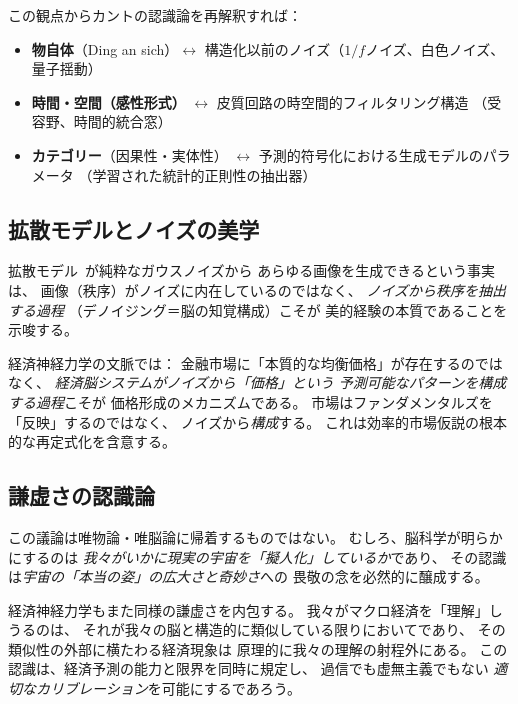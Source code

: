 \documentclass[12pt,twocolumn]{ltjsarticle}
\begin{document}
この観点からカントの認識論を再解釈すれば：

\begin{itemize}
\item \textbf{物自体}（Ding an sich）$\leftrightarrow$
構造化以前のノイズ（$1/f$ノイズ、白色ノイズ、
量子揺動）

\item \textbf{時間・空間（感性形式）} $\leftrightarrow$
皮質回路の時空間的フィルタリング構造
（受容野、時間的統合窓）

\item \textbf{カテゴリー}（因果性・実体性） $\leftrightarrow$
予測的符号化における生成モデルのパラメータ
（学習された統計的正則性の抽出器）
\end{itemize}

\subsection{拡散モデルとノイズの美学}

拡散モデル~\cite{Ho2020}が純粋なガウスノイズから
あらゆる画像を生成できるという事実は、
画像（秩序）がノイズに内在しているのではなく、
\emph{ノイズから秩序を抽出する過程}
（デノイジング＝脳の知覚構成）こそが
美的経験の本質であることを示唆する。

経済神経力学の文脈では：
金融市場に「本質的な均衡価格」が存在するのではなく、
\emph{経済脳システムがノイズから「価格」という
予測可能なパターンを構成する過程}こそが
価格形成のメカニズムである。
市場はファンダメンタルズを「反映」するのではなく、
ノイズから\emph{構成}する。
これは効率的市場仮説の根本的な再定式化を含意する。

\subsection{謙虚さの認識論}

この議論は唯物論・唯脳論に帰着するものではない。
むしろ、脳科学が明らかにするのは
\emph{我々がいかに現実の宇宙を「擬人化」しているか}であり、
その認識は\emph{宇宙の「本当の姿」の広大さと奇妙さ}への
畏敬の念を必然的に醸成する。

経済神経力学もまた同様の謙虚さを内包する。
我々がマクロ経済を「理解」しうるのは、
それが我々の脳と構造的に類似している限りにおいてであり、
その類似性の外部に横たわる経済現象は
原理的に我々の理解の射程外にある。
この認識は、経済予測の能力と限界を同時に規定し、
過信でも虚無主義でもない
\emph{適切なカリブレーション}を可能にするであろう。


\end{document}
